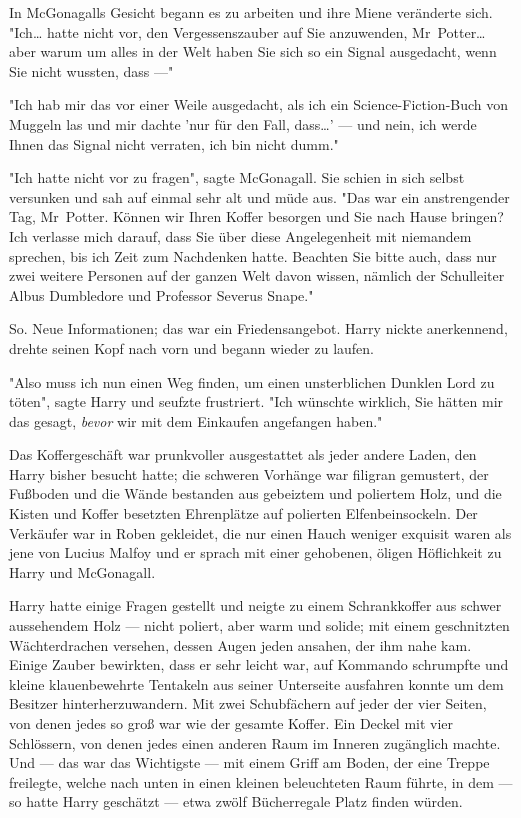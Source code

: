 {In McGonagalls Gesicht begann es zu arbeiten und ihre Miene veränderte sich. "Ich… hatte nicht vor, den Vergessenszauber auf Sie anzuwenden, Mr~Potter… aber warum um alles in der Welt haben Sie sich so ein Signal ausgedacht, wenn Sie nicht wussten, dass ---"

"Ich hab mir das vor einer Weile ausgedacht, als ich ein Science-Fiction-Buch von Muggeln las und mir dachte 'nur für den Fall, dass…' --- und nein, ich werde Ihnen das Signal nicht verraten, ich bin nicht dumm."

"Ich hatte nicht vor zu fragen", sagte McGonagall. Sie schien in sich selbst versunken und sah auf einmal sehr alt und müde aus. "Das war ein anstrengender Tag, Mr~Potter. Können wir Ihren Koffer besorgen und Sie nach Hause bringen? Ich verlasse mich darauf, dass Sie über diese Angelegenheit mit niemandem sprechen, bis ich Zeit zum Nachdenken hatte. Beachten Sie bitte auch, dass nur zwei weitere Personen auf der ganzen Welt davon wissen, nämlich der Schulleiter Albus Dumbledore und Professor Severus Snape."

So. Neue Informationen; das war ein Friedensangebot. Harry nickte anerkennend, drehte seinen Kopf nach vorn und begann wieder zu laufen.

"Also muss ich nun einen Weg finden, um einen unsterblichen Dunklen Lord zu töten", sagte Harry und seufzte frustriert. "Ich wünschte wirklich, Sie hätten mir das gesagt, \emph{bevor} wir mit dem Einkaufen angefangen haben."

\later

Das Koffergeschäft war prunkvoller ausgestattet als jeder andere Laden, den Harry bisher besucht hatte; die schweren Vorhänge war filigran gemustert, der Fußboden und die Wände bestanden aus gebeiztem und poliertem Holz, und die Kisten und Koffer besetzten Ehrenplätze auf polierten Elfenbeinsockeln. Der Verkäufer war in Roben gekleidet, die nur einen Hauch weniger exquisit waren als jene von Lucius Malfoy und er sprach mit einer gehobenen, öligen Höflichkeit zu Harry und McGonagall.

Harry hatte einige Fragen gestellt und neigte zu einem Schrankkoffer aus schwer aussehendem Holz --- nicht poliert, aber warm und solide; mit einem geschnitzten Wächterdrachen versehen, dessen Augen jeden ansahen, der ihm nahe kam. Einige Zauber bewirkten, dass er sehr leicht war, auf Kommando schrumpfte und kleine klauenbewehrte Tentakeln aus seiner Unterseite ausfahren konnte um dem Besitzer hinterherzuwandern. Mit zwei Schubfächern auf jeder der vier Seiten, von denen jedes so groß war wie der gesamte Koffer. Ein Deckel mit vier Schlössern, von denen jedes einen anderen Raum im Inneren zugänglich machte. Und --- das war das Wichtigste --- mit einem Griff am Boden, der eine Treppe freilegte, welche nach unten in einen kleinen beleuchteten Raum führte, in dem --- so hatte Harry geschätzt --- etwa zwölf Bücherregale Platz finden würden.

}

